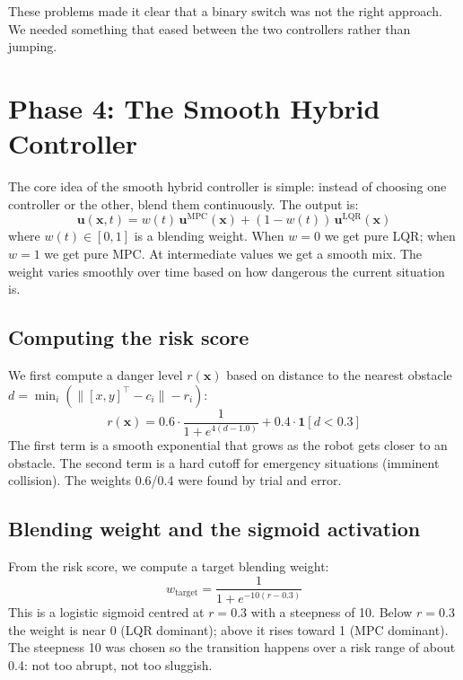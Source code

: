\documentclass[12pt,a4paper]{article}
\begin{document}
These problems made it clear that a binary switch was not the right
approach. We needed something that eased between the two controllers
rather than jumping.

\section{Phase 4: The Smooth Hybrid Controller}

The core idea of the smooth hybrid controller is simple: instead of
choosing one controller or the other, blend them continuously. The output
is:
\begin{equation}\label{eq:blend}
  \mathbf{u}(\mathbf{x}, t) =
    w(t)\,\mathbf{u}^{\text{MPC}}(\mathbf{x}) +
    (1 - w(t))\,\mathbf{u}^{\text{LQR}}(\mathbf{x})
\end{equation}
where $w(t) \in [0, 1]$ is a blending weight. When $w = 0$ we get pure
LQR; when $w = 1$ we get pure MPC. At intermediate values we get a smooth
mix. The weight varies smoothly over time based on how dangerous the
current situation is.

\subsection{Computing the risk score}

We first compute a danger level $r(\mathbf{x})$ based on distance to the
nearest obstacle $d = \min_i(\|[x,y]^\top - c_i\| - r_i)$:
\begin{equation}
  r(\mathbf{x}) = 0.6 \cdot \frac{1}{1 + e^{4(d - 1.0)}} +
                  0.4 \cdot \mathbf{1}[d < 0.3]
\end{equation}
The first term is a smooth exponential that grows as the robot gets closer
to an obstacle. The second term is a hard cutoff for emergency situations
(imminent collision). The weights 0.6/0.4 were found by trial and error.

\subsection{Blending weight and the sigmoid activation}

From the risk score, we compute a target blending weight:
\begin{equation}
  w_{\text{target}} = \frac{1}{1 + e^{-10(r - 0.3)}}
\end{equation}
This is a logistic sigmoid centred at $r = 0.3$ with a steepness of 10.
Below $r = 0.3$ the weight is near 0 (LQR dominant); above it rises
toward 1 (MPC dominant). The steepness 10 was chosen so the transition
happens over a risk range of about 0.4: not too abrupt, not too sluggish.
\end{document}
